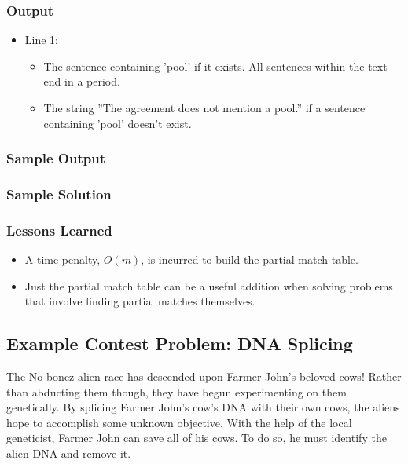 \subsubsection{Output}
\begin{itemize}
	\item Line 1:
	\begin{itemize}
		\item The sentence containing 'pool' if it exists. All sentences within the text end in a period.
		\item The string ''The agreement does not mention a pool.'' if a sentence containing 'pool' doesn't exist.
	\end{itemize}
\end{itemize}

\subsubsection{Sample Output}


\subsubsection{Sample Solution}


\subsubsection{Lessons Learned}
\begin{itemize}
	\item A time penalty, $O(m)$, is incurred to build the partial match table.
	\item Just the partial match table can be a useful addition when solving problems that involve finding partial matches themselves.
\end{itemize}

\subsection{Example Contest Problem: DNA Splicing}
The No-bonez alien race has descended upon Farmer John's beloved cows!
Rather than abducting them though, they have begun experimenting on them genetically.
By splicing Farmer John's cow's DNA with their own cows, the aliens hope to accomplish some unknown objective.
With the help of the local geneticist, Farmer John can save all of his cows.
To do so, he must identify the alien DNA and remove it.

